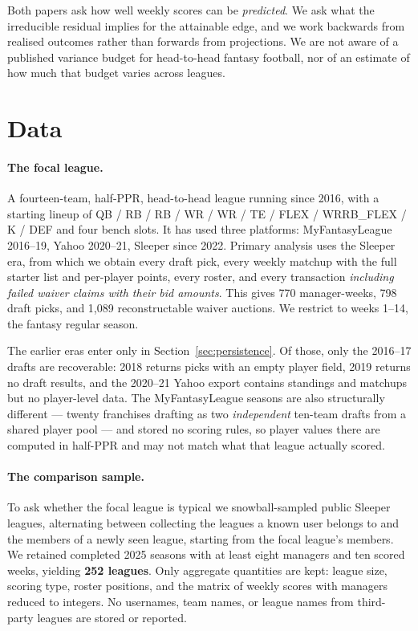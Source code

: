 \documentclass[11pt]{article}
\begin{document}
Both papers ask how well weekly scores can be \emph{predicted}. We ask what the
irreducible residual implies for the attainable edge, and we work backwards from
realised outcomes rather than forwards from projections. We are not aware of a
published variance budget for head-to-head fantasy football, nor of an estimate
of how much that budget varies across leagues.

\section{Data}\label{sec:data}

\paragraph{The focal league.} A fourteen-team, half-PPR, head-to-head league
running since 2016, with a starting lineup of QB / RB / RB / WR / WR / TE /
FLEX / WRRB\_FLEX / K / DEF and four bench slots. It has used three platforms:
MyFantasyLeague 2016--19, Yahoo 2020--21, Sleeper since 2022. Primary analysis
uses the Sleeper era, from which we obtain every draft pick, every weekly matchup
with the full starter list and per-player points, every roster, and every
transaction \emph{including failed waiver claims with their bid amounts}. This
gives 770 manager-weeks, 798 draft picks, and 1{,}089 reconstructable waiver
auctions. We restrict to weeks 1--14, the fantasy regular season.

The earlier eras enter only in Section~\ref{sec:persistence}. Of those, only the
2016--17 drafts are recoverable: 2018 returns picks with an empty player field,
2019 returns no draft results, and the 2020--21 Yahoo export contains standings
and matchups but no player-level data. The MyFantasyLeague seasons are also
structurally different --- twenty franchises drafting as two \emph{independent}
ten-team drafts from a shared player pool --- and stored no scoring rules, so
player values there are computed in half-PPR and may not match what that league
actually scored.

\paragraph{The comparison sample.} To ask whether the focal league is typical we
snowball-sampled public Sleeper leagues, alternating between collecting the
leagues a known user belongs to and the members of a newly seen league, starting
from the focal league's members. We retained completed 2025 seasons with at
least eight managers and ten scored weeks, yielding \textbf{252 leagues}. Only
aggregate quantities are kept: league size, scoring type, roster positions, and
the matrix of weekly scores with managers reduced to integers. No usernames,
team names, or league names from third-party leagues are stored or reported.
\end{document}
